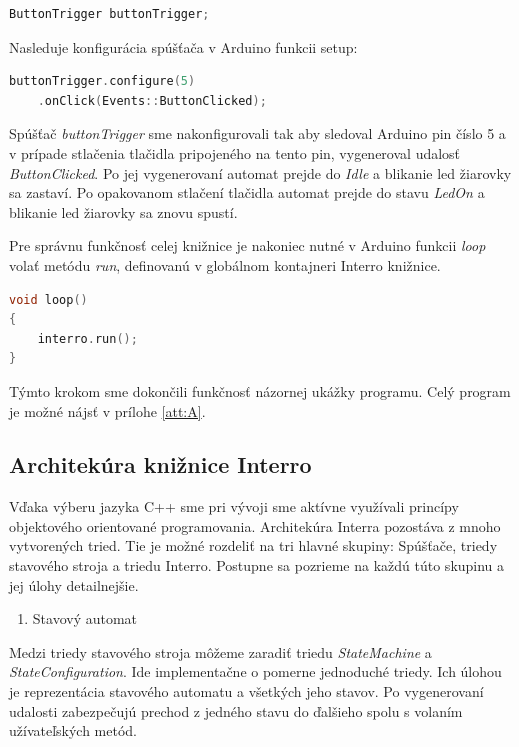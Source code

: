 \begin{lstlisting}[language=c++]  
ButtonTrigger buttonTrigger;            
\end{lstlisting}

Nasleduje konfigurácia spúšťača v Arduino funkcii setup:
\begin{lstlisting}[language=c++]  
buttonTrigger.configure(5)
    .onClick(Events::ButtonClicked); 
\end{lstlisting}

Spúšťač \textit{buttonTrigger} sme nakonfigurovali tak aby sledoval Arduino pin číslo 5 a v prípade stlačenia tlačidla pripojeného na tento pin, vygeneroval udalosť
\textit{ButtonClicked}. Po jej vygenerovaní automat prejde do  \textit{Idle} a blikanie led žiarovky sa zastaví. Po opakovanom stlačení tlačidla automat prejde do
stavu \textit{LedOn} a blikanie led žiarovky sa znovu spustí. \par
Pre správnu funkčnosť celej knižnice je nakoniec nutné v Arduino funkcii \textit{loop} volať metódu \textit{run}, definovanú v globálnom kontajneri Interro knižnice.
\begin{lstlisting}[language=c++]  
void loop()
{
    interro.run();
}
\end{lstlisting}

Týmto krokom sme dokončili funkčnosť názornej ukážky programu. Celý program je možné nájsť v prílohe \ref{att:A}.

\subsection{Architekúra knižnice Interro} \label{subsection:architecture-interro}
Vďaka výberu jazyka C++ sme pri vývoji sme aktívne využívali princípy objektového orientované programovania. Architekúra Interra pozostáva z mnoho vytvorených tried.
Tie je možné rozdeliť na tri hlavné skupiny: Spúšťače, triedy stavového stroja a triedu Interro.
Postupne sa pozrieme na každú túto skupinu a jej úlohy detailnejšie. \par
\begin{enumerate}
    \item Stavový automat
\end{enumerate}
Medzi triedy stavového stroja môžeme zaradiť triedu \textit{StateMachine} a \textit{StateConfiguration}. Ide implementačne o pomerne jednoduché triedy. Ich úlohou
je reprezentácia stavového automatu a všetkých jeho stavov. Po vygenerovaní udalosti zabezpečujú prechod z jedného stavu do ďalšieho spolu s volaním užívateľských
metód. \par

